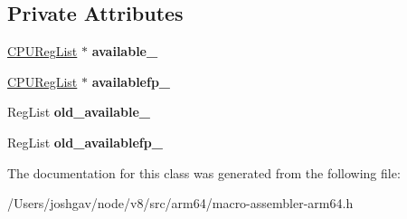 \subsection*{Private Attributes}
\begin{DoxyCompactItemize}
\item 
\hyperlink{classv8_1_1internal_1_1_c_p_u_reg_list}{C\+P\+U\+Reg\+List} $\ast$ {\bfseries available\+\_\+}\hypertarget{classv8_1_1internal_1_1_use_scratch_register_scope_a8fa2d601d821a44e9368fd5597fd7cbe}{}\label{classv8_1_1internal_1_1_use_scratch_register_scope_a8fa2d601d821a44e9368fd5597fd7cbe}

\item 
\hyperlink{classv8_1_1internal_1_1_c_p_u_reg_list}{C\+P\+U\+Reg\+List} $\ast$ {\bfseries availablefp\+\_\+}\hypertarget{classv8_1_1internal_1_1_use_scratch_register_scope_a6620f36d62ed5ac058c3aaa53a82abee}{}\label{classv8_1_1internal_1_1_use_scratch_register_scope_a6620f36d62ed5ac058c3aaa53a82abee}

\item 
Reg\+List {\bfseries old\+\_\+available\+\_\+}\hypertarget{classv8_1_1internal_1_1_use_scratch_register_scope_a841a6ad38ac3b6d1a6a9e5db2ba9ad7d}{}\label{classv8_1_1internal_1_1_use_scratch_register_scope_a841a6ad38ac3b6d1a6a9e5db2ba9ad7d}

\item 
Reg\+List {\bfseries old\+\_\+availablefp\+\_\+}\hypertarget{classv8_1_1internal_1_1_use_scratch_register_scope_aac6ace630c235375815079fae8866c8c}{}\label{classv8_1_1internal_1_1_use_scratch_register_scope_aac6ace630c235375815079fae8866c8c}

\end{DoxyCompactItemize}


The documentation for this class was generated from the following file\+:\begin{DoxyCompactItemize}
\item 
/\+Users/joshgav/node/v8/src/arm64/macro-\/assembler-\/arm64.\+h\end{DoxyCompactItemize}
